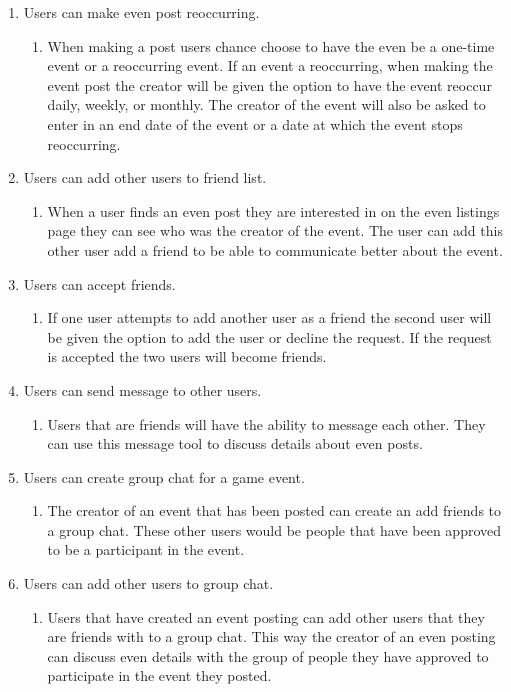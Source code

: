 \documentclass[a4paper]{article}
\begin{document}
\begin{enumerate}
\item Users can make even post reoccurring.
\begin{enumerate}
\item When making a post users chance choose to have the even be a one-time event or a reoccurring event. If an event a reoccurring, when making the event post the creator will be given the option to have the event reoccur daily, weekly, or monthly. The creator of the event will also be asked to enter in an end date of the event or a date at which the event stops reoccurring.     
\end{enumerate}

\item Users can add other users to friend list.
\begin{enumerate}
\item When a user finds an even post they are interested in on the even listings page they can see who was the creator of the event. The user can add this other user add a friend to be able to communicate better about the event.  
\end{enumerate}

\item Users can accept friends.
\begin{enumerate}
\item If one user attempts to add another user as a friend the second user will be given the option to add the user or decline the request. If the request is accepted the two users will become friends. 
\end{enumerate}

\item Users can send message to other users.
\begin{enumerate}
\item Users that are friends will have the ability to message each other. They can use this message tool to discuss details about even posts. 
\end{enumerate}

\item Users can create group chat for a game event.
\begin{enumerate}
\item The creator of an event that has been posted can create an add friends to a group chat. These other users would be people that have been approved to be a participant in the event. 
\end{enumerate}

\item Users can add other users to group chat.
\begin{enumerate}
\item Users that have created an event posting can add other users that they are friends with to a group chat. This way the creator of an even posting can discuss even details with the group of people they have approved to participate in the event they posted.  
\end{enumerate}


\end{enumerate}
\end{document}
